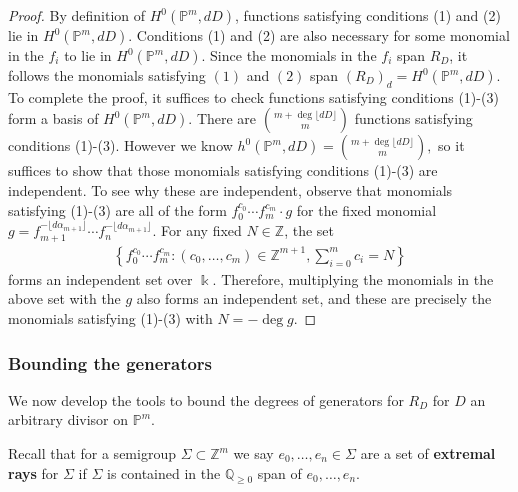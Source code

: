 \documentclass{amsart}
\theoremstyle{plain}
\theoremstyle{definition}
\theoremstyle{remark}
\numberwithin{equation}{section}
\newcommand\sssec{\subsubsection}
\newcommand\bq{{\mathbb Q}}
\newcommand\bp{{\mathbb P}}
\newcommand\bz{{\mathbb Z}}
\newcommand\bk{{\Bbbk}}
\begin{document}
\begin{proof}
By definition of $H^0(\bp^m,dD)$, functions satisfying conditions 
(1) and (2) lie in $H^0(\mathbb{P}^m,dD)$.
Conditions (1) and (2) are also necessary for some monomial in the $f_i$ to lie in
$H^0(\mathbb{P}^m,dD)$.
Since the monomials in the $f_i$ span $R_D$, it follows the monomials satisfying
$(1)$ and $(2)$ span $(R_D)_d = H^0(\bp^m, dD)$.
To complete the proof, it
suffices to check functions satisfying conditions (1)-(3) form
a basis of $H^0(\bp^m,dD)$. There are $\binom{m+ \deg \lfloor dD \rfloor }{m}$
functions satisfying conditions (1)-(3). However we know
$h^0(\bp^m,dD) = \binom{m+ \deg \lfloor dD \rfloor }{m},$ so it suffices to show
that those monomials satisfying conditions (1)-(3) are
independent. 
To see why these are independent, observe that monomials satisfying (1)-(3) are all of the form
$f_0^{c_0} \cdots f_m^{c_m} \cdot g$ for the fixed monomial
$g = f_{m+1}^{-\lfloor d\alpha_{m+1} \rfloor} \cdots f_n^{-\lfloor d\alpha_{m+1} \rfloor}$.
For any fixed $N \in \bz$, the set 
\begin{align*}
 \left\{ f_0^{c_0} \cdots f_m^{c_m} : (c_0, \ldots, c_m) \in \bz^{m+1}, \sum_{i=0}^m c_i = N \right\}	
\end{align*}
forms an independent set over $\bk$.
Therefore, multiplying the monomials in the above set with the $g$ also forms an independent set, and these are precisely the monomials satisfying (1)-(3) 
with $N = -\deg g$.
\end{proof}

\sssec*{Bounding the generators}
\label{sssec:bounding-generators}

We now develop the tools to bound the degrees of generators for $R_D$
for $D$ an arbitrary divisor on $\bp^m$.


Recall that for a semigroup $\Sigma \subset \bz^m$ we say $e_0, \ldots, e_n \in \Sigma$ are a set of {\bf extremal rays}
for $\Sigma$ if 
$\Sigma$ is contained in the $\bq_{\geq 0}$ span of
$e_0, \ldots, e_n$.
\end{document}
